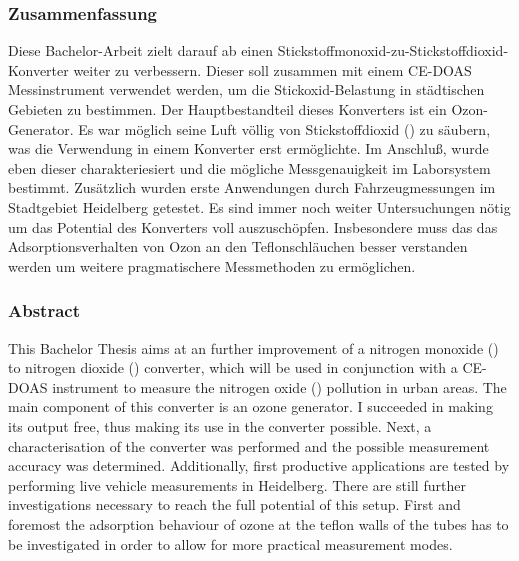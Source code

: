 
\subsubsection*{Zusammenfassung}
\label{sec:Zusammenfassung}

Diese Bachelor-Arbeit zielt darauf ab einen
Stickstoffmonoxid-zu-Stickstoffdioxid-Konverter weiter zu
verbessern. Dieser soll zusammen mit einem CE-DOAS Messinstrument
verwendet werden, um die Stickoxid-Belastung in städtischen Gebieten
zu bestimmen. Der Hauptbestandteil dieses Konverters ist ein
Ozon-Generator. Es war möglich seine Luft völlig von Stickstoffdioxid
() zu säubern, was die Verwendung in einem Konverter erst
ermöglichte. Im Anschluß, wurde eben dieser charakteriesiert und die
mögliche  Messgenauigkeit im Laborsystem bestimmt. Zusätzlich
wurden erste Anwendungen durch Fahrzeugmessungen im Stadtgebiet
Heidelberg getestet. Es sind immer noch weiter Untersuchungen nötig um
das Potential des Konverters voll auszuschöpfen. Insbesondere muss das
das Adsorptionsverhalten von Ozon an den Teflonschläuchen besser
verstanden werden um weitere pragmatischere Messmethoden zu
ermöglichen.


\subsubsection*{Abstract}
\label{sec:abstract}

This Bachelor Thesis aims at an further improvement of a nitrogen
monoxide () to nitrogen dioxide () converter, which
will be used in conjunction with a CE-DOAS instrument to measure the
nitrogen oxide () pollution in urban areas. The main
component of this converter is an ozone generator. I succeeded in
making its output  free, thus making its use in the converter
possible. Next, a characterisation of the converter was performed and
the possible  measurement accuracy was
determined. Additionally, first productive applications are tested by 
performing live vehicle measurements in Heidelberg. There are still
further investigations necessary to reach the full potential of this
setup. First and foremost the adsorption behaviour of ozone at the
teflon walls of the tubes has to be investigated in order to allow for
more practical measurement modes.

